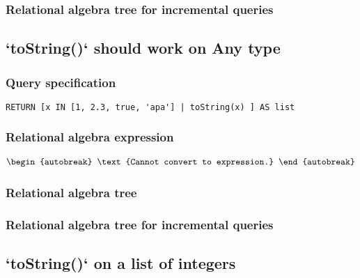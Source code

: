 \subsubsection*{Relational algebra tree for incremental queries}


\subsection{`toString()` should work on Any type}

\subsubsection*{Query specification}

\begin{lstlisting}
RETURN [x IN [1, 2.3, true, 'apa'] | toString(x) ] AS list
\end{lstlisting}

\subsubsection*{Relational algebra expression}

\begin{align*}
\begin{autobreak}
\text{Cannot convert to expression.}
\end{autobreak}
\end{align*}

\subsubsection*{Relational algebra tree}


\subsubsection*{Relational algebra tree for incremental queries}


\subsection{`toString()` on a list of integers}

